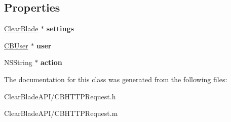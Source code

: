 \subsection*{Properties}
\begin{DoxyCompactItemize}
\item 
\hypertarget{interface_c_b_h_t_t_p_request_a7724199e4703f73b856f2ec2262e5735}{\hyperlink{interface_clear_blade}{Clear\+Blade} $\ast$ {\bfseries settings}}\label{interface_c_b_h_t_t_p_request_a7724199e4703f73b856f2ec2262e5735}

\item 
\hypertarget{interface_c_b_h_t_t_p_request_a8da1f5fa0eef6eef45d22eb694ae3039}{\hyperlink{interface_c_b_user}{C\+B\+User} $\ast$ {\bfseries user}}\label{interface_c_b_h_t_t_p_request_a8da1f5fa0eef6eef45d22eb694ae3039}

\item 
\hypertarget{interface_c_b_h_t_t_p_request_ad37d5f489778cda66ace537ee166cd8e}{N\+S\+String $\ast$ {\bfseries action}}\label{interface_c_b_h_t_t_p_request_ad37d5f489778cda66ace537ee166cd8e}

\end{DoxyCompactItemize}


The documentation for this class was generated from the following files\+:\begin{DoxyCompactItemize}
\item 
Clear\+Blade\+A\+P\+I/C\+B\+H\+T\+T\+P\+Request.\+h\item 
Clear\+Blade\+A\+P\+I/C\+B\+H\+T\+T\+P\+Request.\+m\end{DoxyCompactItemize}
